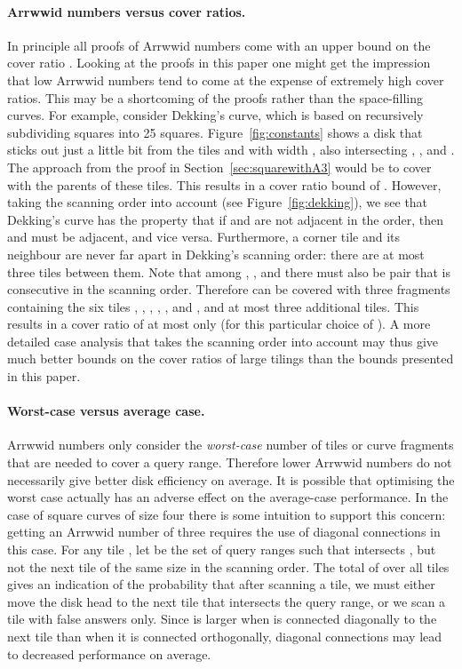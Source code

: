 \documentclass[11pt,a4paper]{article}
\begin{document}
\paragraph{Arrwwid numbers versus cover ratios.}
In principle all proofs of Arrwwid numbers come with an upper bound on the cover ratio . Looking at the proofs in this paper one might get the impression that low Arrwwid numbers tend to come at the expense of extremely high cover ratios. This may be a shortcoming of the proofs rather than the space-filling curves. For example, consider Dekking's curve, which is based on recursively subdividing squares into 25 squares. Figure~\ref{fig:constants} shows a disk  that sticks out just a little bit from the tiles  and  with width , also intersecting , ,  and . The approach from the proof in Section~\ref{sec:squarewithA3} would be to cover  with the parents of these tiles. This results in a cover ratio bound of . However, taking the scanning order into account (see Figure~\ref{fig:dekking}), we see that Dekking's curve has the property that if  and  are not adjacent in the order, then  and  must be adjacent, and vice versa. Furthermore, a corner tile and its neighbour are never far apart in Dekking's scanning order: there are at most three tiles between them. Note that among , ,  and  there must also be pair that is consecutive in the scanning order. Therefore  can be covered with three fragments containing the six tiles , , , , , and , and at most three additional tiles. This results in a cover ratio of at most only  (for this particular choice of ). A more detailed case analysis that takes the scanning order into account may thus give much better bounds on the cover ratios of large tilings than the bounds presented in this paper.

\paragraph{Worst-case versus average case.}
Arrwwid numbers only consider the \emph{worst-case} number of tiles or curve fragments that are needed to cover a query range. Therefore lower Arrwwid numbers do not necessarily give better disk efficiency on average. It is possible that optimising the worst case actually has an adverse effect on the average-case performance. In the case of square curves of size four there is some intuition to support this concern: getting an Arrwwid number of three requires the use of diagonal connections in this case. For any tile , let  be the set of query ranges  such that  intersects , but not the next tile of the same size in the scanning order. The total of  over all tiles  gives an indication of the probability that after scanning a tile, we must either move the disk head to the next tile that intersects the query range, or we scan a tile with false answers only. Since  is larger when  is connected diagonally to the next tile than when it is connected orthogonally, diagonal connections may lead to decreased performance on average.
\end{document}
